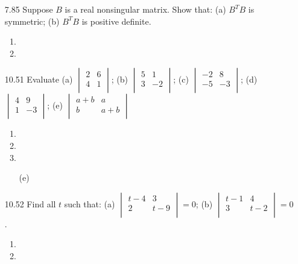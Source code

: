 \documentclass[12pt]{article}
\theoremstyle{definition}
\theoremstyle{plain}
\begin{document}
\begin{enumerate}
\item[7.85]Suppose $B$ is a real nonsingular matrix. Show that: (a) $B^TB$ is symmetric; (b) $B^TB$ is positive definite.
	\begin{enumerate}
	\item
	\item
	\end{enumerate}

\item[10.51]Evaluate (a) $\begin{vmatrix}2&6\\4&1\\\end{vmatrix}$; (b) $\begin{vmatrix}5&1\\3&-2\\\end{vmatrix}$; (c) $\begin{vmatrix}-2&8\\-5&-3\\\end{vmatrix}$; (d) $\begin{vmatrix}4&9\\1&-3\\\end{vmatrix}$; (e) $\begin{vmatrix}a+b&a\\b&a+b\\\end{vmatrix}$
	\begin{enumerate}
	\item
	\item
	\item
	\item[(e)]
	\end{enumerate}

\item[10.52]Find all $t$ such that: (a) $\begin{vmatrix}t-4&3\\2&t-9\\\end{vmatrix} = 0$; (b) $\begin{vmatrix}t-1&4\\3&t-2\\\end{vmatrix} = 0$.
	\begin{enumerate}
	\item
	\item
	\end{enumerate}


\end{enumerate}
\end{document}
